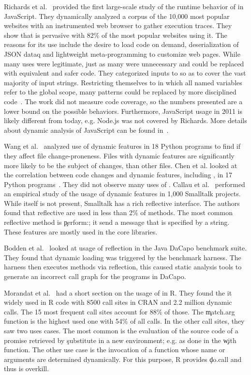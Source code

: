 \documentclass[USenglish,cleveref, autoref, thm-restate]{lipics-v2019}
\begin{document}
Richards et al.~\cite{ecoop11} provided the first large-scale study of
the runtime behavior of \eval in JavaScript. They dynamically analyzed
a corpus of the 10,000 most popular websites with an instrumented web
browser to gather execution traces. They show that \eval is pervasive
with 82\% of the most popular websites using it. The reasons for its
use include the desire to load code on demand, deserialization of JSON
dataq and lightweight meta-programming to customize web pages. While
many uses were legitimate, just as many were unnecessary and could be
replaced with equivalent and safer code. They categorized inputs to
\eval so as to cover the vast majority of input strings. Restricting
themselves to \eval in which all named variables refer to the global
scope, many patterns could be replaced by more disciplined
code~\cite{oopsla12b, moller12}. The work did not measure code
coverage, so the numbers presented are a lower bound on the possible
behaviors. Furthermore, JavaScript usage in 2011 is likely different
from today, e.g. Node.js was not covered by Richards. More details
about dynamic analysis of JavaScript can be found in~\cite{liang}.

Wang et al.~\cite{wang} analyzed use of dynamic features in 18 Python
programs to find if they affect file change-proneness. Files with
dynamic features are significantly more likely to be the subject of
changes, than other files. Chen et al. looked at the correlation
between code changes and dynamic features, including \eval, in 17
Python programs~\cite{chen}. They did not observe many uses of \eval.
Callau et al.~\cite{oscar} performed an empirical study of the usage
of dynamic features in 1,000 Smalltalk projects. While \eval itself is
not present, Smalltalk has a rich reflective interface. The authors
found that reflective are used in less than 2\% of methods. The most
common reflective method is \c{perform:}; it send a message that is
specified by a string. These features are mostly used in the core
libraries.

Bodden et al.~\cite{bodden} looked at usage of reflection in the Java
DaCapo benchmark suite. They found that dynamic loading was triggered
by the benchmark harness. The harness then executes methods via
reflection, this caused static analysis tools to generate an incorrect
call graph for the programs in DaCapo.

Morandat et al.~\cite{ecoop12} had a short section on the usage of
\eval in R. They found the it widely used in R code with 8500 call
sites in CRAN and 2.2 million dynamic calls. The 15 most frequent call
sites account for 88\% of those. The \c{match.arg} function is the
highest used one with 54\% of all calls. In the other call sites, they
saw two uses cases. The most common is the evaluation of the source
code of a promise retrieved by \c{substitute} in a new environment;
e.g. as done in the \c{with} function. The other use case is the
invocation of a function whose name or arguments are determined
dynamically. For this purpose, R provides \c{do.call} and thus \eval
is overkill.
\end{document}
